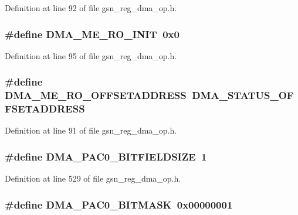 Definition at line 92 of file gsn\_\-reg\_\-dma\_\-op.h.

\hypertarget{a00547_ae7e5eb61b947420f6832373c2e47c033}{
\subsubsection[{DMA\_\-ME\_\-RO\_\-INIT}]{\setlength{\rightskip}{0pt plus 5cm}\#define DMA\_\-ME\_\-RO\_\-INIT~0x0}}
\label{a00547_ae7e5eb61b947420f6832373c2e47c033}


Definition at line 95 of file gsn\_\-reg\_\-dma\_\-op.h.

\hypertarget{a00547_a8374a7407aee39edbbb903b5513078a7}{
\subsubsection[{DMA\_\-ME\_\-RO\_\-OFFSETADDRESS}]{\setlength{\rightskip}{0pt plus 5cm}\#define DMA\_\-ME\_\-RO\_\-OFFSETADDRESS~DMA\_\-STATUS\_\-OFFSETADDRESS}}
\label{a00547_a8374a7407aee39edbbb903b5513078a7}


Definition at line 91 of file gsn\_\-reg\_\-dma\_\-op.h.

\hypertarget{a00547_a3a77fe95412ab94a5b83079bb53ef926}{
\subsubsection[{DMA\_\-PAC0\_\-BITFIELDSIZE}]{\setlength{\rightskip}{0pt plus 5cm}\#define DMA\_\-PAC0\_\-BITFIELDSIZE~1}}
\label{a00547_a3a77fe95412ab94a5b83079bb53ef926}


Definition at line 529 of file gsn\_\-reg\_\-dma\_\-op.h.

\hypertarget{a00547_a4ee449924178c03e13d18c8c345ce85b}{
\subsubsection[{DMA\_\-PAC0\_\-BITMASK}]{\setlength{\rightskip}{0pt plus 5cm}\#define DMA\_\-PAC0\_\-BITMASK~0x00000001}}
\label{a00547_a4ee449924178c03e13d18c8c345ce85b}


